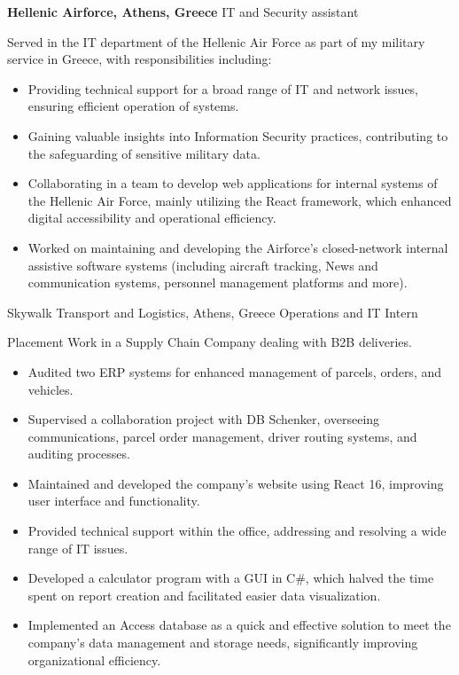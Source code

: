 {\textbf{Hellenic Airforce, Athens, Greece}}
{IT and Security assistant}
{
    Served in the IT department of the Hellenic Air Force as part of my military service in Greece, with
    responsibilities including:
    \begin{itemize}
        \item  Providing technical support for a broad range of IT and network issues, ensuring efficient operation of systems.
        \item Gaining valuable insights into Information Security practices, contributing to the safeguarding of sensitive military data.
        \item Collaborating in a team to develop web applications for internal systems of the Hellenic Air Force, mainly utilizing the React framework, which enhanced digital accessibility and operational efficiency.
        \item Worked on maintaining and developing the Airforce's closed-network internal assistive software systems (including aircraft tracking, News and communication systems, personnel management platforms and more).
    \end{itemize}
}

{Skywalk Transport and Logistics, Athens, Greece }
{Operations and IT Intern}
{

    Placement Work in a Supply Chain Company dealing with B2B deliveries.
    \begin{itemize}
        \item Audited two ERP systems for enhanced management of parcels, orders, and vehicles.
        \item Supervised a collaboration project with DB Schenker, overseeing communications, parcel order management, driver routing systems, and auditing processes.
        \item Maintained and developed the company's website using React 16, improving user interface and functionality.
        \item Provided technical support within the office, addressing and resolving a wide range of IT issues.
        \item Developed a calculator program with a GUI in C\#, which halved the time spent on report creation and facilitated easier data visualization.
        \item Implemented an Access database as a quick and effective solution to meet the company's data management and storage needs, significantly improving organizational efficiency.

    \end{itemize}
}

